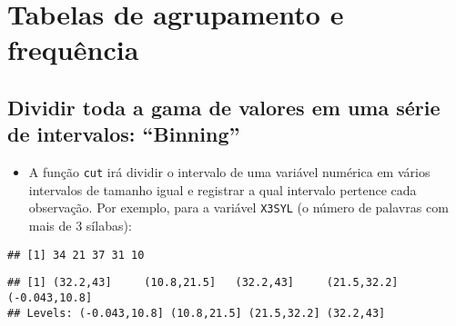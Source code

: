 \documentclass[]{article}
\newenvironment{Shaded}{\begin{snugshade}}{\end{snugshade}}
\newcommand{\KeywordTok}[1]{\textcolor[rgb]{0.13,0.29,0.53}{\textbf{#1}}}
\newcommand{\DecValTok}[1]{\textcolor[rgb]{0.00,0.00,0.81}{#1}}
\newcommand{\StringTok}[1]{\textcolor[rgb]{0.31,0.60,0.02}{#1}}
\newcommand{\CommentTok}[1]{\textcolor[rgb]{0.56,0.35,0.01}{\textit{#1}}}
\newcommand{\OperatorTok}[1]{\textcolor[rgb]{0.81,0.36,0.00}{\textbf{#1}}}
\newcommand{\NormalTok}[1]{#1}
\providecommand{\tightlist}{%
  \setlength{\itemsep}{0pt}\setlength{\parskip}{0pt}}
\begin{document}
\section{Tabelas de agrupamento e
frequência}\label{tabelas-de-agrupamento-e-frequencia}

\subsection{\texorpdfstring{Dividir toda a gama de valores em uma série
de intervalos:
``Binning''}{Dividir toda a gama de valores em uma série de intervalos: Binning}}\label{dividir-toda-a-gama-de-valores-em-uma-serie-de-intervalos-binning}

\begin{itemize}
\tightlist
\item
  A função \texttt{cut} irá dividir o intervalo de uma variável numérica
  em vários intervalos de tamanho igual e registrar a qual intervalo
  pertence cada observação. Por exemplo, para a variável \texttt{X3SYL}
  (o número de palavras com mais de 3 sílabas):
\end{itemize}

\begin{Shaded}
\end{Shaded}

\begin{verbatim}
## [1] 34 21 37 31 10
\end{verbatim}

\begin{Shaded}
\end{Shaded}

\begin{verbatim}
## [1] (32.2,43]     (10.8,21.5]   (32.2,43]     (21.5,32.2]   (-0.043,10.8]
## Levels: (-0.043,10.8] (10.8,21.5] (21.5,32.2] (32.2,43]
\end{verbatim}
\end{document}
